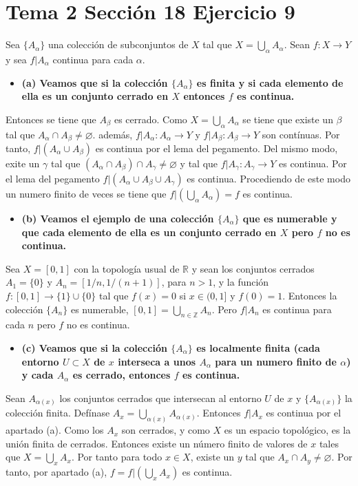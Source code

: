 \documentclass{article}
\begin{document}
\section{Tema 2 Sección 18 Ejercicio 9}
Sea $\{A_\alpha\}$ una colección de subconjuntos de $X$ tal que $X=\bigcup_\alpha A_\alpha$. Sean $f: X\rightarrow Y$ y sea $f|A_\alpha$ continua para cada $\alpha$.
\begin{itemize}
\item \bf (a) \rm Veamos que si la colección $\{A_\alpha\}$ es finita y si cada elemento de ella es un conjunto cerrado en $X$ entonces $f$ es continua.
\end{itemize}
Entonces se tiene que $A_\beta$ es cerrado. Como $X=\bigcup_\alpha A_\alpha$ se tiene que existe un $\beta$ tal que $A_\alpha \cap A_\beta\neq \varnothing$. además, $f|A_\alpha: A_\alpha \rightarrow Y$ y $f|A_\beta: A_\beta\rightarrow Y$ son contínuas. Por tanto, $f|(A_\alpha\cup A_\beta)$ es continua por el lema del pegamento. Del mismo modo, exite un $\gamma$ tal que $(A_\alpha \cap A_\beta)\cap A_\gamma\neq \varnothing $ y tal que $f|A_\gamma:A_\gamma\rightarrow Y$ es continua. Por el lema del pegamento $f|\left(A_\alpha\cup A_\beta \cup A_\gamma\right)$ es continua. Procediendo de este modo un numero finito de veces se tiene que $f|\left(\bigcup_\alpha A_\alpha\right)=f$ es continua.
\begin{itemize}
\item \bf (b) \rm Veamos el ejemplo de una colección $\{A_\alpha\}$ que es numerable y que cada elemento de ella es un conjunto cerrado en $X$ pero $f$ no es continua.
\end{itemize}
Sea $X=[0,1]$ con la topología usual de $\mathbb{R}$ y sean los conjuntos cerrados $A_1=\{0\}$ y $A_n=[1/n,1/(n+1)]$, para $n>1$, y la función $f:[0,1]\rightarrow \{1\}\cup\{0\}$ tal que $f(x)=0$ si $x\in (0,1]$ y $f(0)=1$. Entonces la colección $\{A_n\}$ es numerable, $[0,1]=\bigcup_{n\in \mathbb{Z}} A_n$. Pero $f|A_n$ es continua para cada $n$ pero $f$ no es continua.
\begin{itemize}
\item \bf (c) \rm Veamos que si la colección $\{A_\alpha\}$ es localmente finita (cada entorno $U\subset X$ de $x$ interseca a unos $A_\alpha$ para un numero finito de $\alpha$) y cada $A_\alpha$ es cerrado, entonces $f$ es continua.
\end{itemize}
Sean $A_{\alpha(x)}$ los conjuntos cerrados que intersecan al entorno $U$ de $x$ y $\{A_{\alpha(x)}\}$ la colección finita. Defínase $A_x= \bigcup_{\alpha(x)}A_{\alpha(x)}$. Entonces $f|A_x$ es continua por el apartado (a). Como los $A_x$ son cerrados, y como $X$ es un espacio topológico, es la unión finita de cerrados. Entonces existe un número finito de valores de $x$ tales  que $X=\bigcup_{x} A_x$. Por tanto para todo $x\in X$, existe un $y$ tal que $A_x\cap A_y\neq \varnothing$. Por tanto, por apartado (a), $f=f|(\bigcup_{x} A_x)$ es continua.
\end{document}
